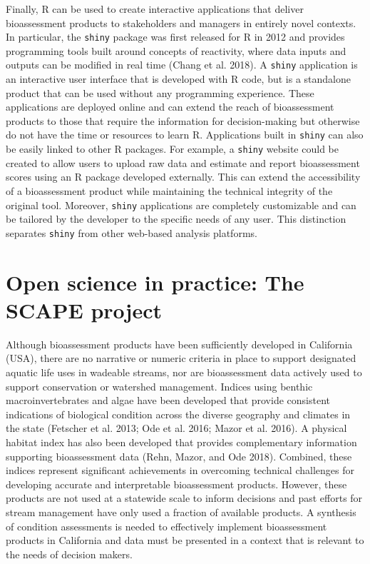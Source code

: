 \documentclass[fleqn,10pt,lineno]{wlpeerj} %
\begin{document}
Finally, R can be used to create interactive applications that deliver bioassessment products to stakeholders and managers in entirely novel contexts. In particular, the \texttt{shiny} package was first released for R in 2012 and provides programming tools built around concepts of reactivity, where data inputs and outputs can be modified in real time (Chang et al. 2018). A \texttt{shiny} application is an interactive user interface that is developed with R code, but is a standalone product that can be used without any programming experience. These applications are deployed online and can extend the reach of bioassessment products to those that require the information for decision-making but otherwise do not have the time or resources to learn R. Applications built in \texttt{shiny} can also be easily linked to other R packages. For example, a \texttt{shiny} website could be created to allow users to upload raw data and estimate and report bioassessment scores using an R package developed externally. This can extend the accessibility of a bioassessment product while maintaining the technical integrity of the original tool. Moreover, \texttt{shiny} applications are completely customizable and can be tailored by the developer to the specific needs of any user. This distinction separates \texttt{shiny} from other web-based analysis platforms.

\hypertarget{open-science-in-practice-the-scape-project}{%
\section{Open science in practice: The SCAPE project}\label{open-science-in-practice-the-scape-project}}

Although bioassessment products have been sufficiently developed in California (USA), there are no narrative or numeric criteria in place to support designated aquatic life uses in wadeable streams, nor are bioassessment data actively used to support conservation or watershed management. Indices using benthic macroinvertebrates and algae have been developed that provide consistent indications of biological condition across the diverse geography and climates in the state (Fetscher et al. 2013; Ode et al. 2016; Mazor et al. 2016). A physical habitat index has also been developed that provides complementary information supporting bioassessment data (Rehn, Mazor, and Ode 2018). Combined, these indices represent significant achievements in overcoming technical challenges for developing accurate and interpretable bioassessment products. However, these products are not used at a statewide scale to inform decisions and past efforts for stream management have only used a fraction of available products. A synthesis of condition assessments is needed to effectively implement bioassessment products in California and data must be presented in a context that is relevant to the needs of decision makers.
\end{document}
